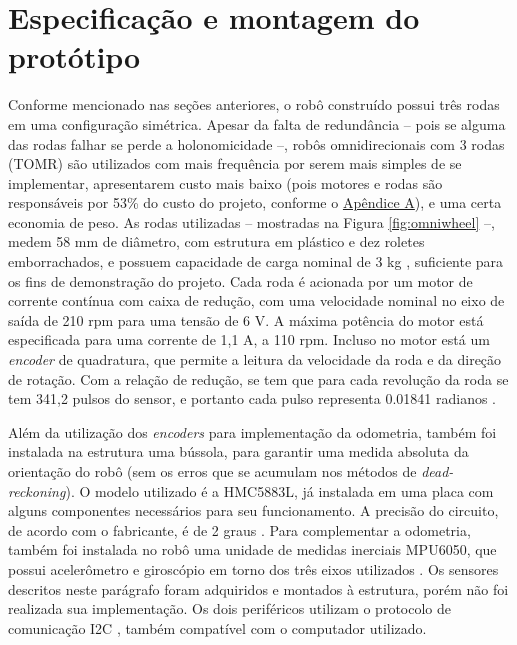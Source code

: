 

\section{Especificação e montagem do protótipo}
\label{sec:montagem}

Conforme mencionado nas seções anteriores, o robô construído possui três rodas em uma configuração simétrica. Apesar da falta de redundância -- pois se alguma das rodas falhar se perde a holonomicidade --, robôs omnidirecionais com 3 rodas (TOMR) são utilizados com mais frequência por serem mais simples de se implementar, apresentarem custo mais baixo (pois motores e rodas são responsáveis por 53\% do custo do projeto, conforme o \hyperref[sec:custo]{Apêndice A}), e uma certa economia de peso. As rodas utilizadas -- mostradas na Figura \ref{fig:omniwheel} --, medem 58 mm de diâmetro, com estrutura em plástico e dez roletes emborrachados, e possuem capacidade de carga nominal de 3 kg \citep{omniwheel}, suficiente para os fins de demonstração do projeto. Cada roda é acionada por um motor de corrente contínua com caixa de redução, com uma velocidade nominal no eixo de saída de 210 rpm para uma tensão de 6 V. A máxima potência do motor está especificada para uma corrente de 1,1 A, a 110 rpm. Incluso no motor está um \textit{encoder} de quadratura, que permite a leitura da velocidade da roda e da direção de rotação. Com a relação de redução, se tem que para cada revolução da roda se tem 341,2 pulsos do sensor, e portanto cada pulso representa 0.01841 radianos \citep{motor}.

Além da utilização dos \textit{encoders} para implementação da odometria, também foi instalada na estrutura uma bússola, para garantir uma medida absoluta da orientação do robô (sem os erros que se acumulam nos métodos de \textit{dead-reckoning}). O modelo utilizado é a HMC5883L, já instalada em uma placa com alguns componentes necessários para seu funcionamento. A precisão do circuito, de acordo com o fabricante, é de 2 graus \citep{HMC5883L}. Para complementar a odometria, também foi instalada no robô uma unidade de medidas inerciais MPU6050, que possui acelerômetro e giroscópio em torno dos três eixos utilizados \citep{MPU6050}. Os sensores descritos neste parágrafo foram adquiridos e montados à estrutura, porém não foi realizada sua implementação. Os dois periféricos utilizam o protocolo de comunicação I2C \citep{semiconductors2000i2c}, também compatível com o computador utilizado.

